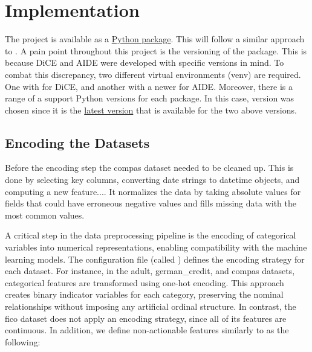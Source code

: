 \chapter{Implementation\label{chap:implementation}}

The project is available as a \href{https://github.com/Hariss-Gills/counterfactual_explainers}{Python package}. This will follow a similar approach to \citet{guidotti2024counterfactual}. A pain point throughout this project is the versioning of the  package. This is because DiCE and AIDE were developed with specific versions in mind. To combat this discrepancy, two different virtual environments (venv) are required. One with  for DiCE, and another with a newer  for AIDE. Moreover, there is a range  of a support Python versions for each  package. In this case, version  was chosen since it is the \href{https://www.tensorflow.org/install/source}{latest version} that is available for the two above versions.

\section{Encoding the Datasets}
Before the encoding step the compas dataset needed to be cleaned up. This is done by selecting key columns, converting date strings to datetime objects, and computing a new feature.... It normalizes the data by taking absolute values for fields that could have erroneous negative values and fills missing data with the most common values. 

A critical step in the data preprocessing pipeline is the encoding of categorical variables into numerical representations, enabling compatibility with the machine learning models. The configuration file (called ) defines the encoding strategy for each dataset. For instance, in the adult, german\_credit, and compas datasets, categorical features are transformed using one-hot encoding. This approach creates binary indicator variables for each category, preserving the nominal relationships without imposing any artificial ordinal structure. In contrast, the fico dataset does not apply an encoding strategy, since all of its features are continuous. In addition, we define non-actionable features similarly to \citet{guidotti2024counterfactual} as the following:


